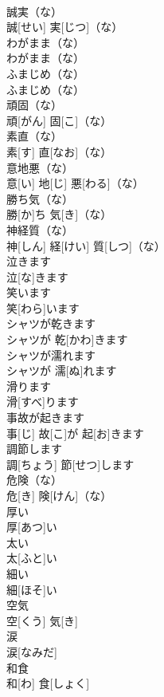 \documentclass[8pt]{extreport}
\begin{document}
\begin{CJK}{UTF8}{min}
\\	誠実（な）	
\\	誠[せい] 実[じつ]（な）		
\\	わがまま（な）	
\\	わがまま（な）		
\\	ふまじめ（な）	
\\	ふまじめ（な）		
\\	頑固（な）	
\\	頑[がん] 固[こ]（な）		
\\	素直（な）	
\\	素[す] 直[なお]（な）		
\\	意地悪（な）	
\\	意[い] 地[じ] 悪[わる]（な）		
\\	勝ち気（な）	
\\	勝[か]ち 気[き]（な）		
\\	神経質（な）	
\\	神[しん] 経[けい] 質[しつ]（な）		
\\	泣きます	
\\	泣[な]きます		
\\	笑います	
\\	笑[わら]います		
\\	シャツが乾きます	
\\	シャツが 乾[かわ]きます		
\\	シャツが濡れます	
\\	シャツが 濡[ぬ]れます		
\\	滑ります	
\\	滑[すべ]ります		
\\	事故が起きます	
\\	事[じ] 故[こ]が 起[お]きます		
\\	調節します	
\\	調[ちょう] 節[せつ]します		
\\	危険（な）	
\\	危[き] 険[けん]（な）		
\\	厚い	
\\	厚[あつ]い		
\\	太い	
\\	太[ふと]い		
\\	細い	
\\	細[ほそ]い		
\\	空気	
\\	空[くう] 気[き]		
\\	涙	
\\	涙[なみだ]		
\\	和食	
\\	和[わ] 食[しょく]		

\end{CJK}
\end{document}
